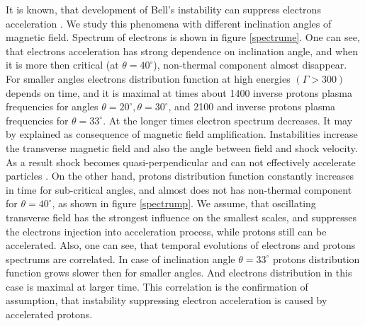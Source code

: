 \documentclass[a4paper]{jpconf}
\begin{document}
	It is known, that development of Bell's instability can suppress electrons acceleration \cite{Crumley2019,2021MNRAS.501.4837L,2021MNRAS.502.5065L}. We study this phenomena with different inclination angles of magnetic field. Spectrum of electrons is shown in figure \ref{spectrume}. One can see, that electrons acceleration has strong dependence on inclination angle, and when it is more then critical (at $\theta = 40^\circ$), non-thermal component almost disappear. For smaller angles electrons distribution function at high energies $(\Gamma > 300)$ depends on time, and it is maximal at times about 1400 inverse protons plasma frequencies for angles $\theta=20^\circ, \theta=30^\circ$, and 2100 and inverse protons plasma frequencies for $\theta = 33^\circ$. At the longer times electron spectrum decreases. It may by explained as consequence of magnetic field amplification. Instabilities increase the transverse magnetic field and also the angle between field and shock velocity. As a result shock becomes quasi-perpendicular and can not effectively accelerate particles \cite{Sironi2011,Romansky18}. On the other hand, protons distribution function constantly increases in time for sub-critical angles, and almost does not has non-thermal component for $\theta = 40^\circ$, as shown in figure \ref{spectrump}. We assume, that oscillating transverse field has the strongest influence on the smallest scales, and suppresses the electrons injection into acceleration process, while protons still can be accelerated. Also, one can see, that temporal evolutions of electrons and protons spectrums are correlated. In case of inclination angle $\theta = 33^\circ$ protons distribution function grows slower then for smaller angles. And electrons distribution in this case is maximal at larger time. This correlation is the confirmation of assumption, that instability suppressing electron acceleration is caused by accelerated protons.
	
\end{document}
